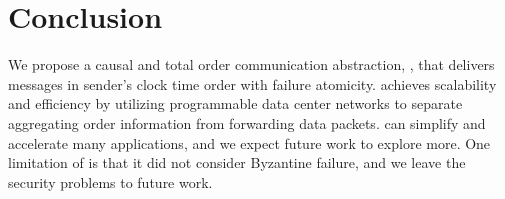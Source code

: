 \section{Conclusion}
\label{sec:conclusion}

We propose a causal and total order communication abstraction, \sys{}, that delivers messages in sender's clock time order with  failure atomicity. 
\sys{} achieves scalability and efficiency by utilizing programmable data center networks to separate aggregating order information from forwarding data packets.
\sys{} can simplify and accelerate many applications, and we expect future work to explore more.
One limitation of \sys{} is that it did not consider Byzantine failure, and we leave the security problems to future work.
